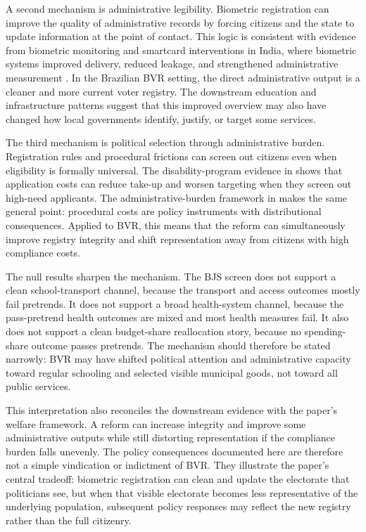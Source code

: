 A second mechanism is administrative legibility. Biometric registration can improve the quality of administrative records by forcing citizens and the state to update information at the point of contact. This logic is consistent with evidence from biometric monitoring and smartcard interventions in India, where biometric systems improved delivery, reduced leakage, and strengthened administrative measurement \citep{Muralidharan2016BuildingStateCapacity, Bossuroy2024BiometriMonitoriService}. In the Brazilian BVR setting, the direct administrative output is a cleaner and more current voter registry. The downstream education and infrastructure patterns suggest that this improved overview may also have changed how local governments identify, justify, or target some services.

The third mechanism is political selection through administrative burden. Registration rules and procedural frictions can screen out citizens even when eligibility is formally universal. The disability-program evidence in \citet{Deshpande2019WhoScreenedOut} shows that application costs can reduce take-up and worsen targeting when they screen out high-need applicants. The administrative-burden framework in \citet{Herd2018} makes the same general point: procedural costs are policy instruments with distributional consequences. Applied to BVR, this means that the reform can simultaneously improve registry integrity and shift representation away from citizens with high compliance costs.

The null results sharpen the mechanism. The BJS screen does not support a clean school-transport channel, because the transport and access outcomes mostly fail pretrends. It does not support a broad health-system channel, because the pass-pretrend health outcomes are mixed and most health measures fail. It also does not support a clean budget-share reallocation story, because no spending-share outcome passes pretrends. The mechanism should therefore be stated narrowly: BVR may have shifted political attention and administrative capacity toward regular schooling and selected visible municipal goods, not toward all public services.

This interpretation also reconciles the downstream evidence with the paper's welfare framework. A reform can increase integrity and improve some administrative outputs while still distorting representation if the compliance burden falls unevenly. The policy consequences documented here are therefore not a simple vindication or indictment of BVR. They illustrate the paper's central tradeoff: biometric registration can clean and update the electorate that politicians see, but when that visible electorate becomes less representative of the underlying population, subsequent policy responses may reflect the new registry rather than the full citizenry.

